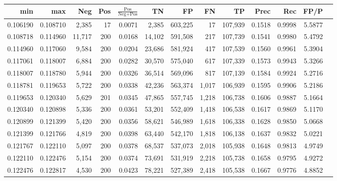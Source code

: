\begin{tabular}{rrrrrrrrrrrrr}
\toprule
     min &      max &    Neg & Pos & $\frac{\text{Pos}}{\text{Neg}+\text{Pos}}$ &      TN &      FP &      FN &      TP &   Prec &    Rec &   FP/P \\
\midrule
0.106190 & 0.108710 &  2,385 &  17 &                                     0.0071 &   2,385 & 603,225 &      17 & 107,939 & 0.1518 & 0.9998 & 5.5877 \\
0.108718 & 0.114960 & 11,717 & 200 &                                     0.0168 &  14,102 & 591,508 &     217 & 107,739 & 0.1541 & 0.9980 & 5.4792 \\
0.114960 & 0.117060 &  9,584 & 200 &                                     0.0204 &  23,686 & 581,924 &     417 & 107,539 & 0.1560 & 0.9961 & 5.3904 \\
0.117061 & 0.118007 &  6,884 & 200 &                                     0.0282 &  30,570 & 575,040 &     617 & 107,339 & 0.1573 & 0.9943 & 5.3266 \\
0.118007 & 0.118780 &  5,944 & 200 &                                     0.0326 &  36,514 & 569,096 &     817 & 107,139 & 0.1584 & 0.9924 & 5.2716 \\
0.118781 & 0.119653 &  5,722 & 200 &                                     0.0338 &  42,236 & 563,374 &   1,017 & 106,939 & 0.1595 & 0.9906 & 5.2186 \\
0.119653 & 0.120340 &  5,629 & 201 &                                     0.0345 &  47,865 & 557,745 &   1,218 & 106,738 & 0.1606 & 0.9887 & 5.1664 \\
0.120340 & 0.120898 &  5,336 & 200 &                                     0.0361 &  53,201 & 552,409 &   1,418 & 106,538 & 0.1617 & 0.9869 & 5.1170 \\
0.120899 & 0.121399 &  5,420 & 200 &                                     0.0356 &  58,621 & 546,989 &   1,618 & 106,338 & 0.1628 & 0.9850 & 5.0668 \\
0.121399 & 0.121766 &  4,819 & 200 &                                     0.0398 &  63,440 & 542,170 &   1,818 & 106,138 & 0.1637 & 0.9832 & 5.0221 \\
0.121767 & 0.122110 &  5,097 & 200 &                                     0.0378 &  68,537 & 537,073 &   2,018 & 105,938 & 0.1648 & 0.9813 & 4.9749 \\
0.122110 & 0.122476 &  5,154 & 200 &                                     0.0374 &  73,691 & 531,919 &   2,218 & 105,738 & 0.1658 & 0.9795 & 4.9272 \\
0.122476 & 0.122817 &  4,530 & 200 &                                     0.0423 &  78,221 & 527,389 &   2,418 & 105,538 & 0.1667 & 0.9776 & 4.8852 \\

\end{tabular}
